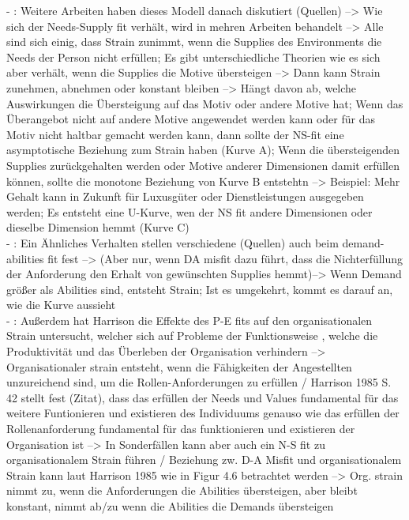 - \cite[S. 21]{edwards:2008}: Weitere Arbeiten haben dieses Modell danach diskutiert (Quellen) --> Wie sich der Needs-Supply fit verhält, wird in mehren Arbeiten behandelt --> Alle sind sich einig, dass Strain zunimmt, wenn die Supplies des Environments die Needs der Person nicht erfüllen; Es gibt unterschiedliche Theorien wie es sich aber verhält, wenn die Supplies die Motive übersteigen --> Dann kann Strain zunehmen, abnehmen oder konstant bleiben --> Hängt davon ab, welche Auswirkungen die Übersteigung auf das Motiv oder andere Motive hat; Wenn das Überangebot nicht auf andere Motive angewendet werden kann oder für das Motiv nicht haltbar gemacht werden kann, dann sollte der NS-fit eine asymptotische Beziehung zum Strain haben (Kurve A); Wenn die übersteigenden Supplies zurückgehalten werden oder Motive anderer Dimensionen damit erfüllen können, sollte die monotone Beziehung von Kurve B entstehtn --> Beispiel: Mehr Gehalt kann in Zukunft für Luxusgüter oder Dienstleistungen ausgegeben werden; Es entsteht eine U-Kurve, wen der NS fit andere Dimensionen oder dieselbe Dimension hemmt (Kurve C) \\
- \cite[S. 22f.]{edwards:2008}: Ein Ähnliches Verhalten stellen verschiedene (Quellen) auch beim demand-abilities fit fest --> (Aber nur, wenn DA misfit dazu führt, dass die Nichterfüllung der Anforderung den Erhalt von gewünschten Supplies hemmt)--> Wenn Demand größer als Abilities sind, entsteht Strain; Ist es umgekehrt, kommt es darauf an, wie die Kurve aussieht \\
- \cite[S. 24]{edwards:2008}: Außerdem hat Harrison die Effekte des P-E fits auf den organisationalen Strain untersucht, welcher sich auf Probleme der Funktionsweise , welche die Produktivität und das Überleben der Organisation verhindern --> Organisationaler strain entsteht, wenn die Fähigkeiten der Angestellten unzureichend sind, um die Rollen-Anforderungen zu erfüllen / Harrison 1985 S. 42 stellt fest (Zitat), dass das erfüllen der Needs und Values fundamental für das weitere Funtionieren und existieren des Individuums genauso wie das erfüllen der Rollenanforderung fundamental für das funktionieren und existieren der Organisation ist --> In Sonderfällen kann aber auch ein N-S fit zu organisationalem Strain führen / Beziehung zw. D-A Misfit und organisationalem Strain kann laut Harrison 1985 wie in Figur 4.6 betrachtet werden --> Org. strain nimmt zu, wenn die Anforderungen die Abilities übersteigen, aber bleibt konstant, nimmt ab/zu wenn die Abilities die Demands übersteigen \\

